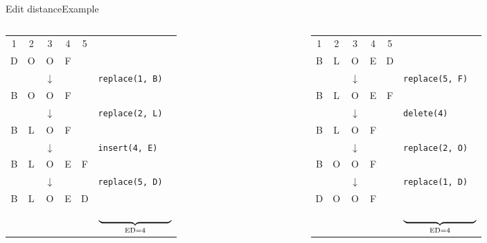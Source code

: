 \begin{frame}{Edit distance}{Example}
  \begin{columns}
    \begin{column}{0.5\linewidth}
      \begin{center}
        \begin{tabular}{c@{}c@{}c@{}c@{}cl}
          1 & 2 & 3 & 4 & 5\\
          D & O & O & F\\
          {} & {} & $\downarrow$ & {} & {} & \texttt{replace(1, B)}\\
          B & O & O & F\\
          {} & {} & $\downarrow$ & {} & {} & \texttt{replace(2, L)}\\
          B & L & O & F\\
          {} & {} & $\downarrow$ & {} & {} & \texttt{insert(4, E)}\\
          B & L & O & E & F\\
          {} & {} & $\downarrow$ & {} & {} & \texttt{replace(5, D)}\\
          B & L & O & E & D\\
          {} & {} & {} & {} & {} &
          $\underbrace{\hspace{7.5em}}_{\mathrm{ED} = 4}$
        \end{tabular}
      \end{center}
    \end{column}
    \begin{column}{0.5\linewidth}
      \begin{center}
        \begin{tabular}{c@{}c@{}c@{}c@{}cl}
          1 & 2 & 3 & 4 & 5\\
          B & L & O & E & D\\
          {} & {} & $\downarrow$ & {} & {} & \texttt{replace(5, F)}\\
          B & L & O & E & F\\
          {} & {} & $\downarrow$ & {} & {} & \texttt{delete(4)}\\
          B & L & O & F\\
          {} & {} & $\downarrow$ & {} & {} & \texttt{replace(2, O)}\\
          B & O & O & F\\
          {} & {} & $\downarrow$ & {} & {} & \texttt{replace(1, D)}\\
          D & O & O & F\\
          {} & {} & {} & {} & {} &
          $\underbrace{\hspace{7.5em}}_{\mathrm{ED} = 4}$
        \end{tabular}
      \end{center}
    \end{column}
  \end{columns}
\end{frame}


